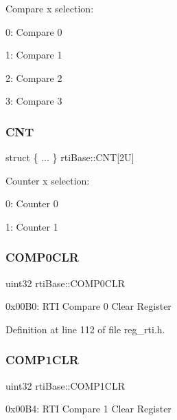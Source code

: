 Compare x selection\+:
\begin{DoxyItemize}
\item 0\+: Compare 0
\item 1\+: Compare 1
\item 2\+: Compare 2
\item 3\+: Compare 3 
\end{DoxyItemize}\mbox{\label{structrtiBase_a468f6c27fd638a205eaf2b481256209a}} 
\subsubsection{\texorpdfstring{C\+NT}{CNT}}
{\footnotesize\ttfamily struct \{ ... \}   rti\+Base\+::\+C\+NT\mbox{[}2\+U\mbox{]}}

Counter x selection\+:
\begin{DoxyItemize}
\item 0\+: Counter 0
\item 1\+: Counter 1 
\end{DoxyItemize}\mbox{\label{structrtiBase_ad86d822d66b1288e26d6fc8449d144b6}} 
\subsubsection{\texorpdfstring{C\+O\+M\+P0\+C\+LR}{COMP0CLR}}
{\footnotesize\ttfamily uint32 rti\+Base\+::\+C\+O\+M\+P0\+C\+LR}

0x00\+B0\+: R\+TI Compare 0 Clear Register 

Definition at line 112 of file reg\+\_\+rti.\+h.

\mbox{\label{structrtiBase_ae40f420750f1f43dd72b7e1619d5269e}} 
\subsubsection{\texorpdfstring{C\+O\+M\+P1\+C\+LR}{COMP1CLR}}
{\footnotesize\ttfamily uint32 rti\+Base\+::\+C\+O\+M\+P1\+C\+LR}

0x00\+B4\+: R\+TI Compare 1 Clear Register 

